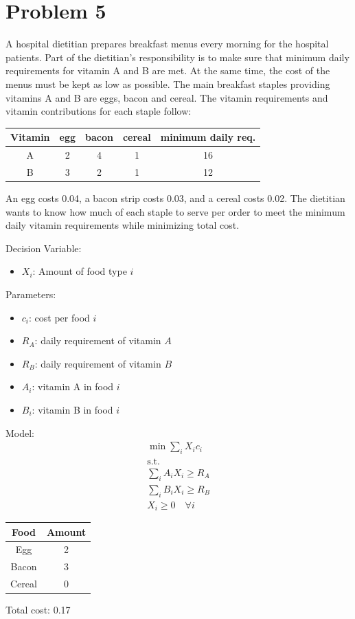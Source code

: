 \documentclass[10pt]{article}
\begin{document}
\section{Problem 5}
A hospital dietitian prepares breakfast menus every morning for the hospital patients. Part of the dietitian's responsibility is to make sure that minimum daily requirements for vitamin A and B are met. At the same time, the cost of the menus must be kept as low as possible. The main breakfast staples providing vitamins A and B are eggs, bacon and cereal. The vitamin requirements and vitamin contributions for each staple follow:
\begin{center}
    \begin{tabular}{|c|c|c|c|c|}
        \hline 
        \textbf{Vitamin} & egg & bacon & cereal & minimum daily req.\\\hline 
        A & 2 & 4 & 1 & 16\\\hline 
        B & 3 & 2 & 1 & 12\\\hline 
    \end{tabular}
\end{center}
An egg costs 0.04, a bacon strip costs 0.03, and a cereal costs 0.02. The dietitian wants to know how much of each staple to serve per order to meet the minimum daily vitamin requirements while minimizing total cost. 

Decision Variable: 
\begin{itemize}
    \item $X_i $: Amount of food type $i $
\end{itemize}
Parameters: 
\begin{itemize}
    \item $c_i $: cost per food $i $
    \item $R_A $: daily requirement of vitamin $A $
    \item $R_B $: daily requirement of vitamin $B $
    \item $A_i $: vitamin A in food $i $
    \item $B_i $: vitamin B in food $i $
\end{itemize}
Model: 
\begin{gather*}
    \min\sum_iX_ic_i\\
    \text{s.t.}\\
    \sum_iA_iX_i \ge R_A\\
    \sum_iB_iX_i \ge R_B\\
    X_i\ge 0 \quad\forall i 
\end{gather*}
\begin{center}
    \begin{tabular}{|c|c|}
        \hline 
        \textbf{Food} & \textbf{Amount}\\\hline 
        Egg & 2\\\hline
        Bacon & 3\\\hline
        Cereal & 0\\\hline
    \end{tabular}
\end{center}
Total cost: 0.17
\newpage 
\end{document}

